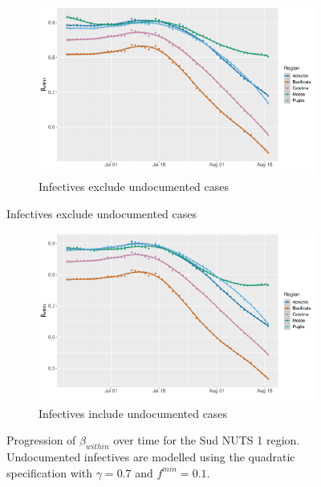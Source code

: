 \documentclass[12pt]{article}
\begin{document}
\begin{appendices}
		\begin{figure}[H]
    	    \centering
    	    \begin{subfigure}{\textwidth}
    	      \centering
    	      \includegraphics[width=0.94\linewidth]{output/model_within_lag14_betawithin_Sud_rolling.pdf}
    	      \caption{Infectives exclude undocumented cases}
    	      \label{fig:beta_within_over_time_sud_regular}
    	    \end{subfigure}
        \end{figure}
        \begin{figure}[H]\ContinuedFloat
    	    \begin{subfigure}{\textwidth}
    	      \centering
    	      \includegraphics[width=0.94\linewidth]{output/model_within_lag14_betawithin_Sud_UndocQuadratic_rolling.pdf}
    	      \caption{Infectives include undocumented cases}
    	      \label{fig:beta_within_over_time_sud_regular_undoc}
    	    \end{subfigure}
    	    \caption{Progression of $\beta_{within}$ over time for the Sud NUTS 1 region. Undocumented infectives are modelled using the quadratic specification with $\gamma = 0.7$ and $f^{min}=0.1$.}
    	    \label{fig:beta_within_over_time_sud}
	    \end{figure}
		

\end{appendices}
\end{document}
